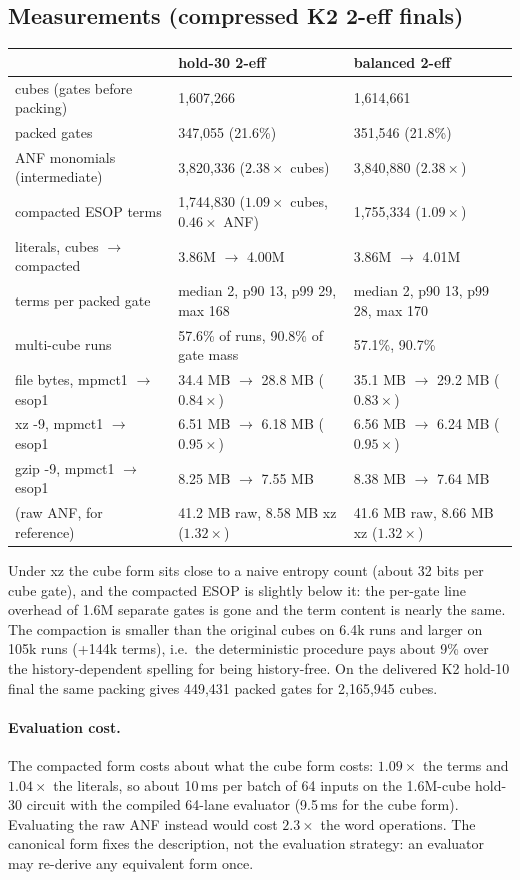 \documentclass[11pt]{article}
\begin{document}
\subsection{Measurements (compressed K2 2-eff finals)}
\begin{center}\footnotesize
\begin{tabular}{lll}\toprule
 & hold-30 2-eff & balanced 2-eff\\\midrule
cubes (gates before packing) & 1,607,266 & 1,614,661\\
packed gates & 347,055 (21.6\%) & 351,546 (21.8\%)\\
ANF monomials (intermediate) & 3,820,336 ($2.38\times$ cubes) & 3,840,880 ($2.38\times$)\\
compacted ESOP terms & 1,744,830 ($1.09\times$ cubes, $0.46\times$ ANF) & 1,755,334 ($1.09\times$)\\
literals, cubes $\to$ compacted & 3.86M $\to$ 4.00M & 3.86M $\to$ 4.01M\\
terms per packed gate & median 2, p90 13, p99 29, max 168 & median 2, p90 13, p99 28, max 170\\
multi-cube runs & 57.6\% of runs, 90.8\% of gate mass & 57.1\%, 90.7\%\\
file bytes, mpmct1 $\to$ esop1 & 34.4 MB $\to$ 28.8 MB ($0.84\times$) & 35.1 MB $\to$ 29.2 MB ($0.83\times$)\\
xz -9, mpmct1 $\to$ esop1 & 6.51 MB $\to$ 6.18 MB ($0.95\times$) & 6.56 MB $\to$ 6.24 MB ($0.95\times$)\\
gzip -9, mpmct1 $\to$ esop1 & 8.25 MB $\to$ 7.55 MB & 8.38 MB $\to$ 7.64 MB\\
(raw ANF, for reference) & 41.2 MB raw, 8.58 MB xz ($1.32\times$) & 41.6 MB raw, 8.66 MB xz ($1.32\times$)\\
\bottomrule\end{tabular}
\end{center}
Under xz the cube form sits close to a naive entropy count (about 32 bits per cube gate), and
the compacted ESOP is slightly below it: the per-gate line overhead of 1.6M separate gates is
gone and the term content is nearly the same. The compaction is smaller than the original
cubes on 6.4k runs and larger on 105k runs (+144k terms), i.e.\ the deterministic procedure
pays about 9\% over the history-dependent spelling for being history-free. On the delivered
K2 hold-10 final the same packing gives 449,431 packed gates for 2,165,945 cubes.

\paragraph{Evaluation cost.} The compacted form costs about what the cube form costs:
$1.09\times$ the terms and $1.04\times$ the literals, so about 10\,ms per batch of 64 inputs
on the 1.6M-cube hold-30 circuit with the compiled 64-lane evaluator (9.5\,ms for the cube
form). Evaluating the raw ANF instead would cost $2.3\times$ the word operations. The
canonical form fixes the description, not the evaluation strategy: an evaluator may re-derive
any equivalent form once.
\end{document}
